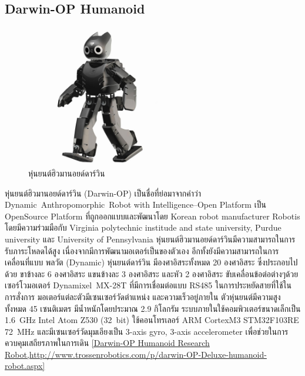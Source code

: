 \clearpage
\subsection*{Darwin-OP Humanoid}
\begin{figure}[ht]
    \centering
    \includegraphics[width=0.55\textwidth]{chapter2/images/Darwin_OP_6.jpg}
    \caption{หุ่นยนต์ฮิวมานอยด์ดาร์วิน}
    \label{fig:darwin_humanoid}
\end{figure}
หุ่นยนต์ฮิวมานอยด์ดาร์วิน (Darwin-OP) เป็นชื่อที่ย่อมาจากคำว่า Dynamic Anthropomorphic Robot
with Intelligence–Open Platform
เป็น OpenSource Platform ที่ถูกออกแบบและพัฒนาโดย Korean robot manufacturer Robotis
โดยมีความร่วมมือกับ Virginia polytechnic institude and state university, Purdue university และ University of Pennsylvania
หุ่นยนต์ฮิวมานอยด์ดาร์วินมีความสามารถในการรับภาระโหลดได้สูง เนื่องจากมีการพัฒนามอเตอร์เป็นของตัวเอง อีกทั้งยังมีความสามารถในการเคลื่อนที่แบบ
พลวัต (Dynamic) หุ่นยนต์ดาร์วิน มีองศาอิสระทั้งหมด 20 องศาอิสระ ซึ่งประกอบไปด้วย ขาข้างละ 6 องศาอิสระ แขนข้างละ 3 องศาอิสระ และหัว 2 องศาอิสระ
ขับเคลื่อนข้อต่อต่างๆด้วยเซอร์โวมอเตอร์ Dynamixel MX-28T ที่มีการเชื่อมต่อแบบ RS485 ในการประหยัดสายที่ใช้ในการสั่งการ มอเตอร์แต่ละตัวมีเซนเซอร์วัดตำแหน่ง 
และความเร็วอยู่ภายใน ตัวหุ่นยนต์มีความสูงทั้งหมด 45 เซนติเมตร มีน้ำหนักโดยประมาณ 2.9 กิโลกรัม
ระบบภายในใช้คอมพิวเตอร์ขนาดเล็กเป็น 1.6 GHz Intel Atom Z530 (32 bit) ใช้คอนโทรเลอร์ ARM CortexM3 STM32F103RE 72 MHz 
และมีเซนเซอร์วัดมุมเอียงเป็น 3-axis gyro, 3-axis accelerometer เพื่อช่วยในการควบคุมเสถียรภาพในการเดิน
\ref{Darwin-OP Humanoid Research Robot,http://www.trossenrobotics.com/p/darwin-OP-Deluxe-humanoid-robot.aspx}

\clearpage
